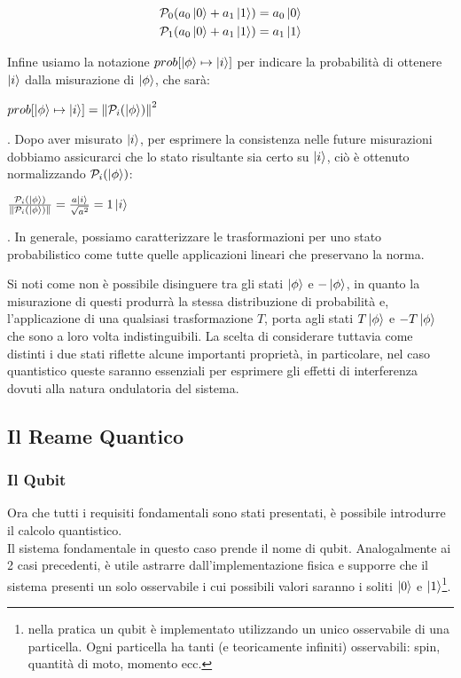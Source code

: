 \documentclass[12pt,a4paper,openright]{report}
\newcommand{\norm}[1]{\left\lVert#1\right\rVert}
\begin{document}
    \begin{center}
        \begin{align*}
            &\mathcal{P}_0(a_0\ket0 + a_1\ket1) = a_0\ket0 \\
            &\mathcal{P}_1(a_0\ket0 + a_1\ket1) = a_1\ket1
        \end{align*}    
    \end{center}
Infine usiamo la notazione $prob[\ket{\phi} \mapsto \ket{i}]$ per indicare la probabilità di ottenere $\ket{i}$ dalla misurazione di $\ket{\phi}$, 
che sarà:
\begin{center}
    $prob[\ket{\phi} \mapsto \ket{i}] = \norm{\mathcal{P}_i(\ket{\phi})}^2$
\end{center}
. Dopo aver misurato $\ket{i}$, per esprimere la consistenza nelle future misurazioni dobbiamo assicurarci che lo stato risultante sia certo su $\ket{i}$,
ciò è ottenuto normalizzando $\mathcal{P}_i(\ket{\phi})$:
\begin{center}
    $\frac{\mathcal{P}_i(\ket{\phi})}{\norm{\mathcal{P}_i(\ket{\phi})}}=\frac{a\ket{i}}{\sqrt{a^2}}=1\ket{i}$
\end{center}
. In generale, possiamo caratterizzare le trasformazioni per uno stato probabilistico come tutte quelle applicazioni lineari che preservano la norma.\par
Si noti come non è possibile disinguere tra gli stati $\ket{\phi}$ e $-\ket{\phi}$, in quanto la misurazione di questi produrrà la stessa
distribuzione di probabilità e, l'applicazione di una qualsiasi trasformazione $T$, porta agli stati $T\ket{\phi}$ e $-T\ket{\phi}$ che sono a loro volta
indistinguibili. La scelta di considerare tuttavia come distinti i due stati riflette alcune importanti proprietà, in particolare, nel
caso quantistico queste saranno essenziali per esprimere gli effetti di interferenza dovuti alla natura ondulatoria del sistema.   

\subsection{Il Reame Quantico}
\subsubsection{Il Qubit}
Ora che tutti i requisiti fondamentali sono stati presentati, è possibile introdurre il calcolo quantistico.\\
Il sistema fondamentale in questo caso prende il nome di qubit. Analogalmente ai 2 casi precedenti, è utile astrarre dall'implementazione fisica
e supporre che il sistema presenti un solo osservabile i cui possibili valori saranno i soliti $\ket0$ e $\ket1$\footnote{nella pratica un qubit è implementato utilizzando un unico osservabile di una particella. Ogni particella ha tanti (e teoricamente infiniti) osservabili: spin, quantità di moto, momento ecc. }.
\end{document}

